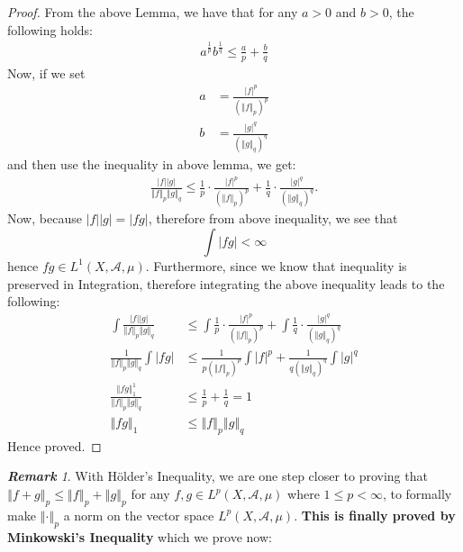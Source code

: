 \documentclass{article}
\theoremstyle{definition}
\theoremstyle{remark}
\newtheorem*{remark}{\textbf{Remark}}
\theoremstyle{definition}
\theoremstyle{definition}
\theoremstyle{definition}
\newcommand{\abs}[1]{\left \vert #1\right \vert}
\newcommand{\norm}[1]{\left \Vert #1 \right \Vert}
\newcommand{\alg}[1]{\mathscr{#1}}
\newcommand{\Lp}[1]{L^{p}\left (#1\right )}
\newcommand{\LS}[2]{L^{#1}\left (#2\right )}
\begin{document}
\begin{proof}
	From the above Lemma, we have that for any $ a > 0 $ and $ b> 0	 $, the following holds:
	\begin{align*}
		a^{\frac{1}{p}} b^{\frac{1}{q}} \le \frac{a}{p} + \frac{b}{q}
	\end{align*}
Now, if we set 
\begin{align*}
	a &= \frac{\abs{f}^{p}}{{\left (\norm{f}_p\right )}^{p}}\\
	b &= \frac{\abs{g}^{q}}{{\left (\norm{g}_q\right )}^{q}}
\end{align*}
and then use the inequality in above lemma, we get:
\begin{align*}
	\frac{\abs{f} \abs{g}}{\norm{f}_{p} \norm{g}_{q}} \le \frac{1}{p}\cdot \frac{\abs{f}^{p}}{{\left (\norm{f}_p\right )}^{p}} + \frac{1}{q} \cdot \frac{\abs{g}^{q}}{{\left (\norm{g}_q\right )}^{q}}.
\end{align*}
Now, because $ \abs{f}\abs{g} = \abs{fg} $, therefore from above inequality, we see that
\[\int \abs{fg} < \infty\]
hence $ fg \in \LS{1}{X,\alg{A},\mu} $. Furthermore, since we know that inequality is preserved in Integration, therefore integrating the above inequality leads to the following:
\begin{align*}
	\int \frac{\abs{f} \abs{g}}{\norm{f}_{p} \norm{g}_{q}} &\le \int \frac{1}{p}\cdot \frac{\abs{f}^{p}}{{\left (\norm{f}_p\right )}^{p}} + \int \frac{1}{q} \cdot \frac{\abs{g}^{q}}{{\left (\norm{g}_q\right )}^{q}}\\
	\frac{1}{\norm{f}_p\norm{g}_q}\int \abs{fg} &\le \frac{1}{p \left (\norm{f}_p\right )^{p}}\int  \abs{f}^{p} + \frac{1}{q \left (\norm{g}_q\right )^{q}}\int  \abs{g}^{q}\\
	\frac{\norm{fg}^{1}_1}{\norm{f}_p\norm{g}_q} &\le \frac{1}{p} + \frac{1}{q} =1\\
	\norm{fg}_1&\le \norm{f}_p \norm{g}_q
\end{align*}
Hence proved.
\end{proof}
\begin{remark}
	With H\"older's Inequality, we are one step closer to proving that $ \norm{f+g}_p \le\norm{f}_p + \norm{g}_p  $ for any $ f,g\in \LS{p}{X, \alg{A}, \mu} $ where $ 1\le p < \infty $, to formally make $ \norm{\cdot}_p $ a norm on the vector space $ \Lp{X,\alg{A},\mu} $. \textbf{This is finally proved by Minkowski's Inequality} which we prove now: 
\end{remark}
\hrulefill
\end{document}
